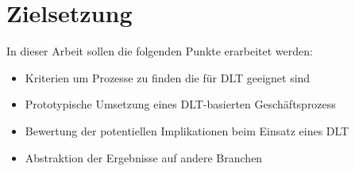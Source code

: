 \section{Zielsetzung}

In dieser Arbeit sollen die folgenden Punkte erarbeitet werden:

\begin{itemize}
	\item Kriterien um Prozesse zu finden die für DLT geeignet sind
	\item Prototypische Umsetzung eines DLT-basierten Geschäftsprozess
	\item Bewertung der potentiellen Implikationen beim Einsatz eines DLT
	\item Abstraktion der Ergebnisse auf andere Branchen
\end{itemize}

\newpage